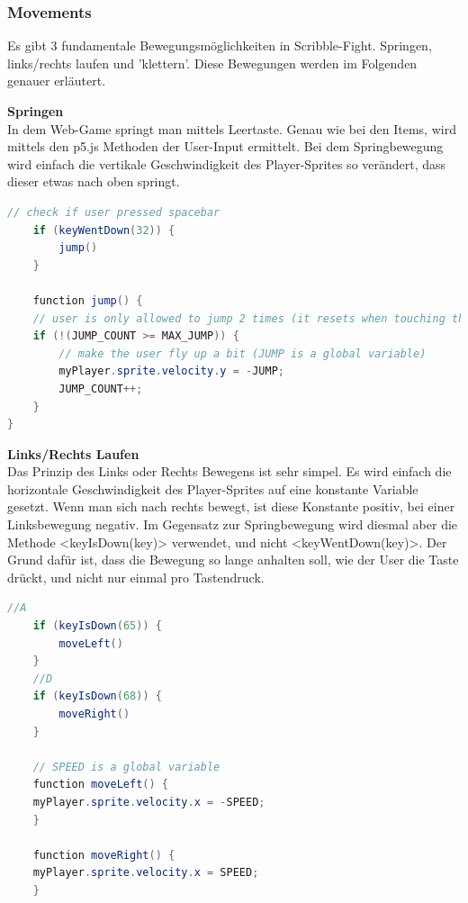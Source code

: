 \subsubsection{Movements}
Es gibt 3 fundamentale Bewegungsmöglichkeiten in Scribble-Fight. Springen, links/rechts laufen und 'klettern'. Diese Bewegungen werden im Folgenden genauer erläutert.

\textbf{Springen}
\\
In dem Web-Game springt man mittels Leertaste. Genau wie bei den Items, wird mittels den p5.js Methoden der User-Input ermittelt.
Bei dem Springbewegung wird einfach die vertikale Geschwindigkeit des Player-Sprites so verändert, dass dieser etwas nach oben springt.
\\
\begin{lstlisting}[caption=Jumping,language=Java,label=lst:impl:jumping]
    // check if user pressed spacebar
    if (keyWentDown(32)) {
        jump()
    }

    function jump() {
    // user is only allowed to jump 2 times (it resets when touching the ground)
    if (!(JUMP_COUNT >= MAX_JUMP)) {
        // make the user fly up a bit (JUMP is a global variable)
        myPlayer.sprite.velocity.y = -JUMP;
        JUMP_COUNT++;
    }
}
\end{lstlisting}

\textbf{Links/Rechts Laufen}
\\
Das Prinzip des Links oder Rechts Bewegens ist sehr simpel. Es wird einfach die horizontale Geschwindigkeit des Player-Sprites auf eine konstante Variable gesetzt.
Wenn man sich nach rechts bewegt, ist diese Konstante positiv, bei einer Linksbewegung negativ. Im Gegensatz zur Springbewegung wird diesmal aber die Methode <keyIsDown(key)> verwendet, und nicht <keyWentDown(key)>.
Der Grund dafür ist, dass die Bewegung so lange anhalten soll, wie der User die Taste drückt, und nicht nur einmal pro Tastendruck.

\begin{lstlisting}[caption=Links/Rechts-Movement,language=Java,label=lst:impl:moving]
    //A
    if (keyIsDown(65)) {
        moveLeft()
    }
    //D
    if (keyIsDown(68)) {
        moveRight()
    }

    // SPEED is a global variable
    function moveLeft() {
    myPlayer.sprite.velocity.x = -SPEED;
    }

    function moveRight() {
    myPlayer.sprite.velocity.x = SPEED;
    }
\end{lstlisting}

